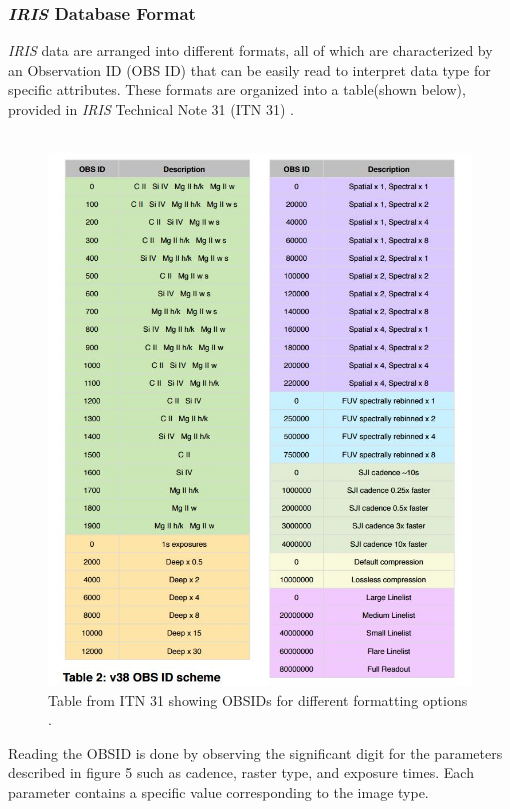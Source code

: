 \documentclass[10pt,a4paper,titlepage]{article}
\begin{document}
			\subsubsection{\textit{IRIS} Database Format}
				\textit{IRIS} data are arranged into different formats, all of which are characterized by an Observation ID (OBS ID) that can be easily read to interpret data type for specific attributes. These formats are organized into a table(shown below), provided in \textit{IRIS} Technical Note 31 (ITN 31) \cite{ITN31}.\\\\
				\begin{figure}[H]
					\includegraphics[scale=0.62]{obsid}
					\centering
					\caption{Table from ITN 31 showing OBSIDs for different formatting options \cite{ITN31}.}
					\centering
				\end{figure}
			
						
				Reading the OBSID is done by observing the significant digit for the parameters described in figure 5 such as cadence, raster type, and exposure times. Each parameter contains a specific value corresponding to the image type.
				
\end{document}
